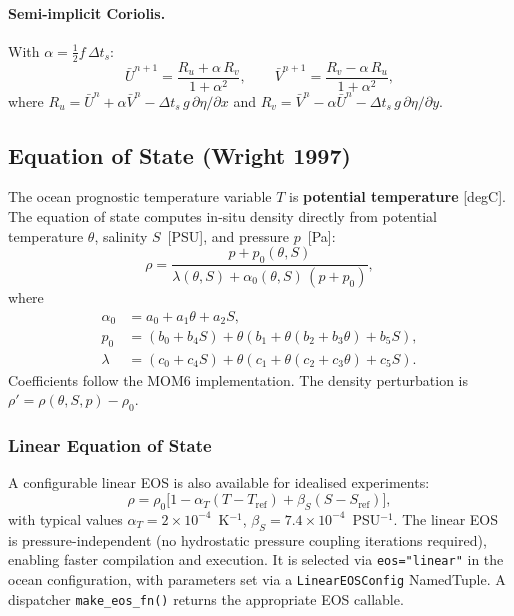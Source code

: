 \documentclass[11pt,a4paper]{article}
\newcommand{\pp}{\partial}
\newcommand{\half}{\tfrac{1}{2}}
\begin{document}
\paragraph{Semi-implicit Coriolis.} With $\alpha=\half f\,\Delta t_s$:
\begin{equation}
  \bar U^{n+1} = \frac{R_u+\alpha\,R_v}{1+\alpha^2}, \qquad
  \bar V^{n+1} = \frac{R_v-\alpha\,R_u}{1+\alpha^2},
\end{equation}
where $R_u=\bar U^n+\alpha\bar V^n-\Delta t_s\,g\,\pp\eta/\pp x$ and $R_v=\bar V^n-\alpha\bar U^n-\Delta t_s\,g\,\pp\eta/\pp y$.

\subsection{Equation of State (Wright 1997)}

The ocean prognostic temperature variable $T$ is \textbf{potential temperature}
[degC].  The \citet{Wright1997} equation of state computes in-situ density directly from
potential temperature $\theta$, salinity $S$~[PSU], and pressure $p$~[Pa]:
\begin{equation}
  \rho = \frac{p+p_0(\theta,S)}{\lambda(\theta,S)+\alpha_0(\theta,S)\,(p+p_0)},
\end{equation}
where
\begin{align}
  \alpha_0 &= a_0+a_1 \theta+a_2 S, \\
  p_0 &= (b_0+b_4 S)+\theta(b_1+\theta(b_2+b_3 \theta)+b_5 S), \\
  \lambda &= (c_0+c_4 S)+\theta(c_1+\theta(c_2+c_3 \theta)+c_5 S).
\end{align}
Coefficients follow the MOM6 implementation.  The density perturbation is $\rho'=\rho(\theta,S,p)-\rho_0$.

\subsubsection{Linear Equation of State}

A configurable linear EOS is also available for idealised experiments:
\begin{equation}
  \rho = \rho_0\bigl[1 - \alpha_T(T-T_{\mathrm{ref}}) + \beta_S(S-S_{\mathrm{ref}})\bigr],
\end{equation}
with typical values $\alpha_T=2\times10^{-4}$~K$^{-1}$, $\beta_S=7.4\times10^{-4}$~PSU$^{-1}$.
The linear EOS is pressure-independent (no hydrostatic pressure coupling iterations required), enabling faster compilation and execution.  It is selected via \texttt{eos="linear"} in the ocean configuration, with parameters set via a \texttt{LinearEOSConfig} NamedTuple.  A dispatcher \texttt{make\_eos\_fn()} returns the appropriate EOS callable.
\end{document}
